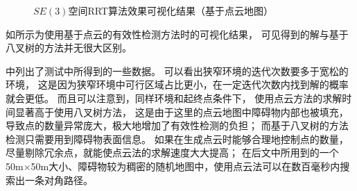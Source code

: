 \begin{figure}[!ht]
  \setlength{\subfigcapskip}{-1bp}
  \centering
  \begin{minipage}{\textwidth}

  \centering
  \subfigure{\label{fig:rrtse3_pcl_in_sparse_env_overview}}\addtocounter{subfigure}{-2}
  \hspace{0.2em}
  \subfigure{\label{fig:rrtse3_pcl_in_sparse_env_detail}}\addtocounter{subfigure}{-2}
  \hspace{0.2em}
  \subfigure{\label{fig:rrtse3_pcl_in_narrow_passage_overview}}\addtocounter{subfigure}{-2}
  \hspace{0.2em}
  \subfigure{\label{fig:rrtse3_pcl_in_narrow_passage_detail}}\addtocounter{subfigure}{-2}
  
  \end{minipage}
  \caption{$SE(3)$空间RRT算法效果可视化结果（基于点云地图）}
  \label{fig:performance_of_rrtse3_pcl}
\end{figure}

如所示为使用基于点云的有效性检测方法时的可视化结果，
可见得到的解与基于八叉树的方法并无很大区别。

中列出了测试中所得到的一些数据。
可以看出狭窄环境的迭代次数要多于宽松的环境，
这是因为狭窄环境中可行区域占比更小，在一定迭代次数内找到解的概率就会更低。
而且可以注意到，同样环境和起终点条件下，
使用点云方法的求解时间显著高于使用八叉树方法，
这是由于这里的点云地图中障碍物内部也被填充，导致点的数量异常庞大，极大地增加了有效性检测的负担；
而基于八叉树的方法检测只需要用到障碍物表面信息。
如果在生成点云时能够合理地控制点的数量，尽量剔除冗余点，就能使点云法的求解速度大大提高；
在后文中所用到的一个50m$\times$50m大小、障碍物较为稠密的随机地图中，使用点云法可以在数百毫秒内搜索出一条对角路径。

